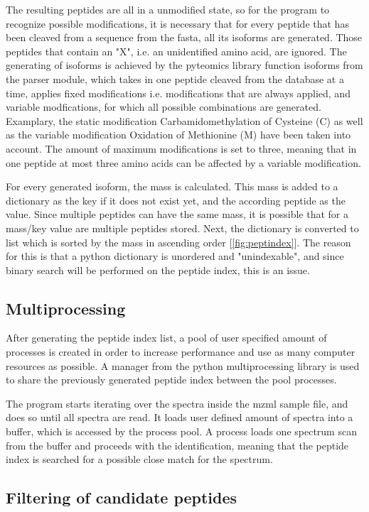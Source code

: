 \documentclass[11pt]{article}
\begin{document}
The resulting peptides are all in a unmodified state, so for the program to recognize possible modifications, it is necessary that for every peptide that has been cleaved from a sequence from the fasta, all its isoforms are generated. Those peptides that contain an "X", i.e. an unidentified amino acid, are ignored. The generating of isoforms is achieved by the pyteomics library function isoforms from the parser module, which takes in one peptide cleaved from the database at a time, applies fixed modifications i.e. modifications that are always applied, and variable modfications, for which all possible combinations are generated. Examplary, the static modification Carbamidomethylation of Cysteine (C) as well as the variable modification Oxidation of Methionine (M) have been taken into account. The amount of maximum modifications is set to three, meaning that in one peptide at most three amino acids can be affected by a variable modification.

For every generated isoform, the mass is calculated. This mass is added to a dictionary as the key if it does not exist yet, and the according peptide as the value. Since multiple peptides can have the same mass, it is possible that for a mass/key value are multiple peptides stored. Next, the dictionary is converted to list which is sorted by the mass in ascending order [\cref{fig:peptindex}]. The reason for this is that a python dictionary is unordered and "unindexable", and since binary search will be performed on the peptide index, this is an issue.
 
\subsection{Multiprocessing}
After generating the peptide index list, a pool of user specified amount of processes is created in order to increase performance and use as many computer resources as possible. A manager from the python multiprocessing library is used to share the previously generated peptide index between the pool processes. 

The program starts iterating over the spectra inside the mzml sample file, and does so until all spectra are read. It loads user defined amount of spectra into a buffer, which is accessed by the process pool. A process loads one spectrum scan from the buffer and proceeds with the identification, meaning that the peptide index is searched for a possible close match for the spectrum.

\subsection{Filtering of candidate peptides}
\end{document}
